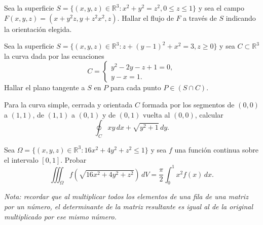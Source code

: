
\begin{question}
    Sea la superficie $S = \{(x,y,z) \in \mathbb{R}^3 : x^2 + y^2 = z^2, 0 \leq z \leq 1\}$ y sea el campo $F(x,y,z) = (x + y^2 z, y + z^2 x^2, z)$. Hallar el flujo de $F$ a través de $S$ indicando la orientación elegida.
\end{question}


\begin{question}
   Sea la superficie $S = \{(x,y,z) \in \mathbb{R}^3 : z + (y - 1)^2 + x^2 = 3, z \geq 0\}$ y sea $C \subset \mathbb{R}^3$ la curva dada por las ecuaciones
\[
C = \begin{cases} 
    y^2 - 2y - z + 1 = 0, \\
    y - x = 1.
\end{cases}
\]
Hallar el plano tangente a $S$ en $P$ para cada punto $P \in (S \cap C)$.
\end{question}


\begin{question}
    Para la curva simple, cerrada y orientada $C$ formada por los segmentos de $(0,0)$ a $(1,1)$, de $(1,1)$ a $(0,1)$ y de $(0,1)$ vuelta al $(0,0)$, calcular
\[
\oint_C xy \, dx + \sqrt{y^2+1} \, dy.
\]
\end{question}


\begin{question}
    Sea $\Omega = \{(x,y,z) \in \mathbb{R}^3 : 16x^2 + 4y^2 + z^2 \leq 1\}$ y sea $f$ una función continua sobre el intervalo $[0,1]$. Probar
\[
\iiint_\Omega f(\sqrt{16x^2 + 4y^2 + z^2}) \, dV = \frac{\pi}{2} \int_0^1 x^2f(x) \, dx.
\]

\textit{Nota: recordar que al multiplicar todos los elementos de una fila de una matriz por un número, el determinante de la matriz resultante es igual al de la original multiplicado por ese mismo número.}
\end{question}

